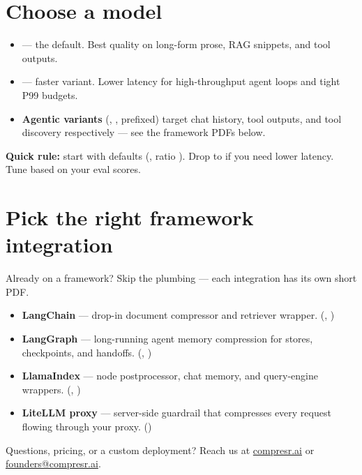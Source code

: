 \documentclass[10pt]{article}
\begin{document}
\section{Choose a model}\label{sec:models}

\begin{itemize}\itemsep1pt
    \item {} — the default. Best quality on
          long-form prose, RAG snippets, and tool outputs.
    \item {} — faster variant.
          Lower latency for high-throughput agent loops and tight P99
          budgets.
    \item \textbf{Agentic variants} (, ,
           prefixed) target chat history, tool
          outputs, and tool discovery respectively — see the framework
          PDFs below.
\end{itemize}

\begin{cprNoteBox}
\textbf{Quick rule:} start with defaults (,
ratio ). Drop to  if you
need lower latency. Tune 
based on your eval scores.
\end{cprNoteBox}

\section{Pick the right framework integration}

Already on a framework? Skip the plumbing — each integration has its
own short PDF.

{\sloppy
\begin{itemize}\itemsep1pt
    \item \textbf{LangChain} — drop-in document compressor and
          retriever wrapper.
          (,
          )
    \item \textbf{LangGraph} — long-running agent memory compression
          for stores, checkpoints, and handoffs.
          (,
          )
    \item \textbf{LlamaIndex} — node postprocessor, chat memory, and
          query-engine wrappers.
          (,
          )
    \item \textbf{LiteLLM proxy} — server-side guardrail that
          compresses every request flowing through your proxy.
          ()
\end{itemize}
\par}

Questions, pricing, or a custom deployment? Reach us at
\href{https://compresr.ai}{compresr.ai} or
\href{mailto:founders@compresr.ai}{founders@compresr.ai}.
\end{document}
